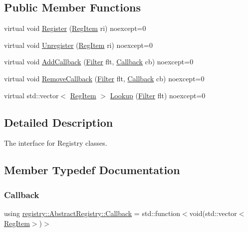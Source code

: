 \subsection*{Public Member Functions}
\begin{DoxyCompactItemize}
\item 
virtual void \hyperlink{classregistry_1_1AbstractRegistry_a5deafe61aa33b1be6b261d815e7397a1}{Register} (\hyperlink{classregistry_1_1RegItem}{Reg\+Item} ri) noexcept=0
\item 
virtual void \hyperlink{classregistry_1_1AbstractRegistry_ac5bb3b6a75a63a474f6b0afb31ea51c1}{Unregister} (\hyperlink{classregistry_1_1RegItem}{Reg\+Item} ri) noexcept=0
\item 
virtual void \hyperlink{classregistry_1_1AbstractRegistry_a83f61ca483c22185ddf43653ca65a8ef}{Add\+Callback} (\hyperlink{classregistry_1_1Filter}{Filter} flt, \hyperlink{classregistry_1_1AbstractRegistry_a08a798ca9ca1c4c983ebd2386ca3c315}{Callback} cb) noexcept=0
\item 
virtual void \hyperlink{classregistry_1_1AbstractRegistry_ae09a4b165d916b6c212988d882d1a33f}{Remove\+Callback} (\hyperlink{classregistry_1_1Filter}{Filter} flt, \hyperlink{classregistry_1_1AbstractRegistry_a08a798ca9ca1c4c983ebd2386ca3c315}{Callback} cb) noexcept=0
\item 
virtual std\+::vector$<$ \hyperlink{classregistry_1_1RegItem}{Reg\+Item} $>$ \hyperlink{classregistry_1_1AbstractRegistry_a978d5b55eeea945b0cc441e28a084518}{Lookup} (\hyperlink{classregistry_1_1Filter}{Filter} flt) noexcept=0
\end{DoxyCompactItemize}


\subsection{Detailed Description}
The interface for Registry classes. 

\subsection{Member Typedef Documentation}
\mbox{\label{classregistry_1_1AbstractRegistry_a08a798ca9ca1c4c983ebd2386ca3c315}} 
\subsubsection{\texorpdfstring{Callback}{Callback}}
{\footnotesize\ttfamily using \hyperlink{classregistry_1_1AbstractRegistry_a08a798ca9ca1c4c983ebd2386ca3c315}{registry\+::\+Abstract\+Registry\+::\+Callback} =  std\+::function$<$void(std\+::vector$<$\hyperlink{classregistry_1_1RegItem}{Reg\+Item}$>$)$>$}

